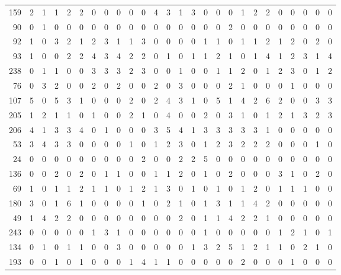 \begin{longtable}{@{\extracolsep{\fill}}rccccccccccccccccccccccccc@{}}
159 & 2 & 1 & 1 & 2 & 2 & 0 & 0 & 0 & 0 & 0 & 4 & 3 & 1 & 3 & 0 & 0 & 0 & 1 & 2 & 2 & 0 & 0 & 0 & 0 & 0 \\
90 & 0 & 1 & 0 & 0 & 0 & 0 & 0 & 0 & 0 & 0 & 0 & 0 & 0 & 0 & 0 & 0 & 2 & 0 & 0 & 0 & 0 & 0 & 0 & 0 & 0 \\
92 & 1 & 0 & 3 & 2 & 1 & 2 & 3 & 1 & 1 & 3 & 0 & 0 & 0 & 0 & 1 & 1 & 0 & 1 & 1 & 2 & 1 & 2 & 0 & 2 & 0 \\
93 & 1 & 0 & 0 & 2 & 2 & 4 & 3 & 4 & 2 & 2 & 0 & 1 & 0 & 1 & 1 & 2 & 1 & 0 & 1 & 4 & 1 & 2 & 3 & 1 & 4 \\
238 & 0 & 1 & 1 & 0 & 0 & 3 & 3 & 3 & 2 & 3 & 0 & 0 & 1 & 0 & 0 & 1 & 1 & 2 & 0 & 1 & 2 & 3 & 0 & 1 & 2 \\
76 & 0 & 3 & 2 & 0 & 0 & 2 & 0 & 2 & 0 & 0 & 2 & 0 & 3 & 0 & 0 & 0 & 2 & 1 & 0 & 0 & 0 & 1 & 0 & 0 & 0 \\
107 & 5 & 0 & 5 & 3 & 1 & 0 & 0 & 0 & 2 & 0 & 2 & 4 & 3 & 1 & 0 & 5 & 1 & 4 & 2 & 6 & 2 & 0 & 0 & 3 & 3 \\
205 & 1 & 2 & 1 & 1 & 0 & 1 & 0 & 0 & 2 & 1 & 0 & 4 & 0 & 0 & 2 & 0 & 3 & 1 & 0 & 1 & 2 & 1 & 3 & 2 & 3 \\
206 & 4 & 1 & 3 & 3 & 4 & 0 & 1 & 0 & 0 & 0 & 3 & 5 & 4 & 1 & 3 & 3 & 3 & 3 & 3 & 1 & 0 & 0 & 0 & 0 & 0 \\
53 & 3 & 4 & 3 & 3 & 0 & 0 & 0 & 0 & 1 & 0 & 1 & 2 & 3 & 0 & 1 & 2 & 3 & 2 & 2 & 2 & 0 & 0 & 0 & 1 & 0 \\
24 & 0 & 0 & 0 & 0 & 0 & 0 & 0 & 0 & 0 & 2 & 0 & 0 & 2 & 2 & 5 & 0 & 0 & 0 & 0 & 0 & 0 & 0 & 0 & 0 & 0 \\
136 & 0 & 0 & 2 & 0 & 2 & 0 & 1 & 1 & 0 & 0 & 1 & 1 & 2 & 0 & 1 & 0 & 2 & 0 & 0 & 0 & 3 & 1 & 0 & 2 & 0 \\
69 & 1 & 0 & 1 & 1 & 2 & 1 & 1 & 0 & 1 & 2 & 1 & 3 & 0 & 1 & 0 & 1 & 0 & 1 & 2 & 0 & 1 & 1 & 1 & 0 & 0 \\
180 & 3 & 0 & 1 & 6 & 1 & 0 & 0 & 0 & 0 & 1 & 0 & 2 & 1 & 0 & 1 & 3 & 1 & 1 & 4 & 2 & 0 & 0 & 0 & 0 & 0 \\
49 & 1 & 4 & 2 & 2 & 0 & 0 & 0 & 0 & 0 & 0 & 0 & 0 & 2 & 0 & 1 & 1 & 4 & 2 & 2 & 1 & 0 & 0 & 0 & 0 & 0 \\
243 & 0 & 0 & 0 & 0 & 0 & 1 & 3 & 1 & 0 & 0 & 0 & 0 & 0 & 0 & 1 & 0 & 0 & 0 & 0 & 0 & 1 & 2 & 1 & 0 & 1 \\
134 & 0 & 1 & 0 & 1 & 1 & 0 & 0 & 3 & 0 & 0 & 0 & 0 & 0 & 1 & 3 & 2 & 5 & 1 & 2 & 1 & 1 & 0 & 2 & 1 & 0 \\
193 & 0 & 0 & 1 & 0 & 1 & 0 & 0 & 0 & 1 & 4 & 1 & 1 & 0 & 0 & 0 & 0 & 0 & 2 & 0 & 0 & 0 & 1 & 0 & 0 & 0 \\

\end{longtable}
